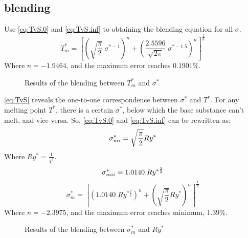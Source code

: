\documentclass[review, 1p, number, sort&compress,table]{elsarticle}
\begin{document}
	\subsection{blending}
	Use \autoref{eq:TvS.0} and  \autoref{eq:TvS.inf} to obtaining the blending equation for all $\sigma$.
	\begin{equation} \label{eq:TvS}
		T^*_m=\left[ \left( \sqrt{\frac{\pi}{2}}    \; \sigma^{*-1}\right)^n+ \left(\frac{2.5596}{\sqrt{2\pi}} \; \sigma^{*-1.5}\right)^n\right]^{\frac{1}{n}}
	\end{equation}
	Where $n=-1.9464$, and the maximum error reaches $0.1901\%$. \\
		\begin{figure*}[ht!]
			\begin{center}
			\end{center}
			\caption{Results of the blending between $T^*_m$ and $\sigma^{*}$  }
			\label{fig:A.TvS}
		\end{figure*}

	\autoref{eq:TvS} reveals the one-to-one correspondence between $\sigma^*$ and $T^{*}$. For any melting point $T^*$, there is a certain $\sigma^{*}$, below which the base substance can't melt, and vice versa. So, \autoref{eq:TvS.0} and \autoref{eq:TvS.inf} can be rewritten as:
	\begin{equation}  \label{eq:SvT.0}
		\sigma^{*}_{m\uppercase\expandafter{\romannumeral1}}=\sqrt{\frac{\pi}{2}}Ry^{*}
	\end{equation}
	Where $Ry^{*}=\frac{1}{T^{*}}$.  \\
	\begin{equation}  \label{eq:SvT.inf}
		\sigma^{*}_{m\uppercase\expandafter{\romannumeral2}}=1.0140 \; Ry^{*\frac{2}{3}}
	\end{equation}
	\begin{equation}  \label{eq:SvT}
	\sigma^{*}_{m}=\left[ \left( 1.0140 \; Ry^{*\frac{2}{3}}\right)^n+ \left( \sqrt{\frac{\pi}{2}}Ry^{*}\right)^n\right]^\frac{1}{n}
	\end{equation}
	Where $n=-2.3975$, and the maximum error reaches minimum, $1.39\%$.
			\begin{figure*}[ht!]
				\begin{center}
				\end{center}
				\caption{Results of the blending between $\sigma^*_m$ and $Ry^{*}$  }
				\label{fig:A.SvR}
			\end{figure*}
			\\
			
\end{document}
